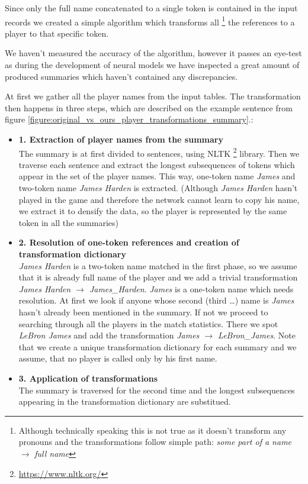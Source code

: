 Since only the full name concatenated to a single token is contained in the input records we created a simple algorithm which transforms all \footnote{Although technically speaking this is not true as it doesn't transform any pronouns and the transformations follow simple path: \emph{some part of a name} $\rightarrow$ \emph{full name}} the references to a player to that specific token.

We haven't measured the accuracy of the algorithm, however it passes an eye-test as during the development of neural models we have inspected a great amount of produced summaries which haven't contained any discrepancies.

At first we gather all the player names from the input tables. The transformation then happens in three steps, which are described on the example sentence from figure \ref{figure:original_vs_ours_player_transformations_summary}.:
\begin{itemize}
    \item \textbf{1. Extraction of player names from the summary} \hfill \\
    The summary is at first divided to sentences, using NLTK \footnote{\url{https://www.nltk.org/}} library. Then we traverse each sentence and extract the longest subsequences of tokens which appear in the set of the player names. This way, one-token name \emph{James} and two-token name \emph{James Harden} is extracted. (Although \emph{James Harden} hasn't played in the game and therefore the network cannot learn to copy his name, we extract it to densify the data, so the player is represented by the same token in all the summaries)
    \item \textbf{2. Resolution of one-token references and creation of transformation dictionary} \hfill \\
    \emph{James Harden} is a two-token name matched in the first phase, so we assume that it is already full name of the player and we add a trivial transformation \emph{James Harden $\rightarrow$ James\_Harden}. \emph{James} is a one-token name which needs resolution. At first we look if anyone whose second (third \dots) name is \emph{James} hasn't already been mentioned in the summary. If not we proceed to searching through all the players in the match statistics. There we spot \emph{LeBron James} and add the transformation \emph{James $\rightarrow$ LeBron\_James}. Note that we create a unique transformation dictionary for each summary and we assume, that no player is called only by his first name.
    \item \textbf{3. Application of transformations} \hfill \\
    The summary is traversed for the second time and the longest subsequences appearing in the transformation dictionary are substitued.
\end{itemize}

